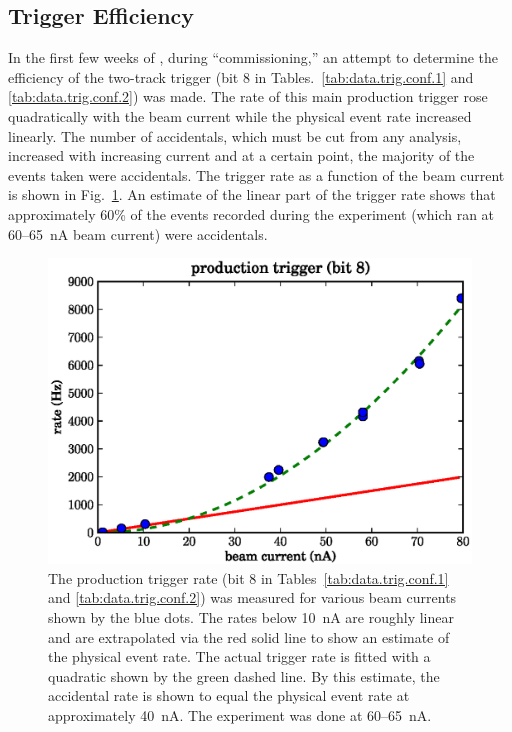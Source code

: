 \subsection{\label{sec:calib.trig.eff}Trigger Efficiency}

In the first few weeks of , during ``commissioning,'' an attempt to determine the efficiency of the two-track trigger (bit 8 in Tables.~\ref{tab:data.trig.conf.1} and \ref{tab:data.trig.conf.2}) was made. The rate of this main production trigger rose quadratically with the beam current while the physical event rate increased linearly. The number of accidentals, which must be cut from any analysis, increased with increasing current and at a certain point, the majority of the events taken were accidentals. The trigger rate as a function of the beam current is shown in Fig.~\ref{fig:data.trig.eff}. An estimate of the linear part of the trigger rate shows that approximately 60\% of the events recorded during the  experiment (which ran at 60--65~nA beam current) were accidentals.

\begin{figure}\begin{center}
\includegraphics[width=0.6\columnwidth]{figures/calib/trig/trigger_study.eps}
\caption[Trigger Rate vs. Beam Current]{\label{fig:data.trig.eff}The production trigger rate (bit 8 in Tables~\ref{tab:data.trig.conf.1} and \ref{tab:data.trig.conf.2}) was measured for various beam currents shown by the blue dots. The rates below 10~nA are roughly linear and are extrapolated via the red solid line to show an estimate of the physical event rate. The actual trigger rate is fitted with a quadratic shown by the green dashed line. By this estimate, the accidental rate is shown to equal the physical event rate at approximately 40~nA. The  experiment was done at 60--65~nA.}
\end{center}\end{figure}

\FloatBarrier
